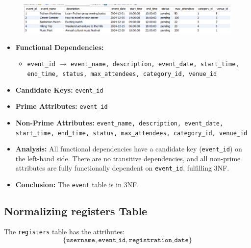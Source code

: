 \begin{figure}
    [h]
    \centering
    \includegraphics{images/table_data/event.png}
\end{figure}

\begin{itemize}
    \item \textbf{Functional Dependencies:}
    \begin{itemize}
        \item \texttt{event\_id} $\rightarrow$ \texttt{event\_name, description, event\_date, start\_time, end\_time, status, max\_attendees, category\_id, venue\_id}
    \end{itemize}

    \item \textbf{Candidate Keys:} \texttt{event\_id}

    \item \textbf{Prime Attributes:} \texttt{event\_id}

    \item \textbf{Non-Prime Attributes:} \texttt{event\_name, description, event\_date, start\_time, end\_time, status, max\_attendees, category\_id, venue\_id}

    \item \textbf{Analysis:} All functional dependencies have a candidate key (\texttt{event\_id}) on the left-hand side. There are no transitive dependencies, and all non-prime attributes are fully functionally dependent on \texttt{event\_id}, fulfilling 3NF.

    \item \textbf{Conclusion:} The \texttt{event} table is in 3NF.
\end{itemize}

\subsection{Normalizing registers Table}

The \texttt{registers} table has the attributes:
\[
\{ \texttt{username}, \texttt{event\_id}, \texttt{registration\_date} \}
\]


